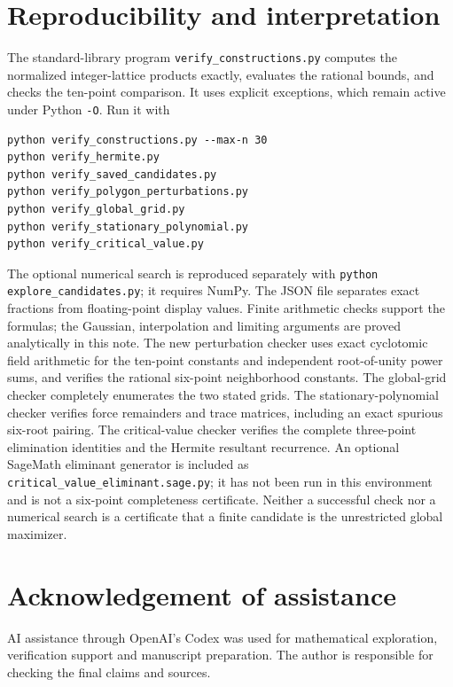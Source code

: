 \documentclass[11pt]{article}
\theoremstyle{remark}
\numberwithin{equation}{section}
\begin{document}
\section{Reproducibility and interpretation}
The standard-library program \texttt{verify\_constructions.py} computes
the normalized integer-lattice products exactly, evaluates the
rational bounds, and checks the ten-point comparison.
It uses explicit exceptions, which remain active under Python
\texttt{-O}. Run it with
\begin{verbatim}
python verify_constructions.py --max-n 30
python verify_hermite.py
python verify_saved_candidates.py
python verify_polygon_perturbations.py
python verify_global_grid.py
python verify_stationary_polynomial.py
python verify_critical_value.py
\end{verbatim}
The optional numerical search is reproduced separately with
\texttt{python explore\_candidates.py}; it requires NumPy.
The JSON file separates exact fractions from floating-point display
values. Finite arithmetic checks support the formulas; the Gaussian,
interpolation and limiting arguments are proved analytically in this note.
The new perturbation checker uses exact cyclotomic field arithmetic
for the ten-point constants and independent root-of-unity power sums,
and verifies the rational six-point neighborhood constants.
The global-grid checker completely enumerates the two stated grids.
The stationary-polynomial checker verifies force remainders and trace
matrices, including an exact spurious six-root pairing. The critical-value
checker verifies the complete three-point elimination identities and
the Hermite resultant recurrence. An optional SageMath eliminant
generator is included as \texttt{critical\_value\_eliminant.sage.py};
it has not been run in this environment and is not a six-point
completeness certificate.
Neither a successful check nor a numerical search is a certificate
that a finite candidate is the unrestricted global maximizer.

\section*{Acknowledgement of assistance}
AI assistance through OpenAI's Codex was used for mathematical
exploration, verification support and manuscript preparation.
The author is responsible for checking the final claims and sources.
\end{document}
